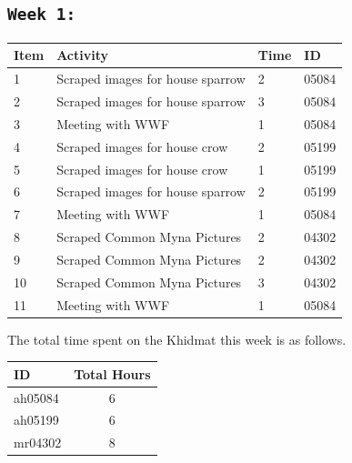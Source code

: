 \documentclass[11pt]{article}
\begin{document}
\subsection{\texttt{Week 1: }}
\begin{center}
\begin{tabular}{|l|l|l|l|}
  \hline
  \textbf{Item} 	& \textbf{Activity} & \textbf{Time} & \textbf{ID} \\\hline
  1 & Scraped images for house sparrow & 2 & 05084 \\ \hline
  2 & Scraped images for house sparrow & 3 & 05084\\ \hline
  3 & Meeting with WWF & 1 & 05084\\ \hline
  4 & Scraped images for house crow & 2 & 05199\\ \hline
  5 & Scraped images for house crow & 1 & 05199\\ \hline
  6 & Scraped images for house sparrow & 2 & 05199\\ \hline
  7 & Meeting with WWF & 1 & 05084\\ \hline
  8 & Scraped Common Myna Pictures & 2 & 04302\\ \hline
  9 & Scraped Common Myna Pictures & 2 & 04302\\ \hline
  10 & Scraped Common Myna Pictures & 3 & 04302\\ \hline
  11 & Meeting with WWF & 1 & 05084 \\ \hline
\end{tabular}
    
\end{center}
The total time spent on the Khidmat this week is as follows.    
\begin{center}
    
\begin{tabular}{|l|c|}
  \hline
  \textbf{ID} & \textbf{Total Hours}\\\hline
  ah05084 & 6 \\\hline
  ah05199 & 6 \\\hline
  mr04302 & 8 \\\hline
\end{tabular}
\end{center}
\newpage
\end{document}
